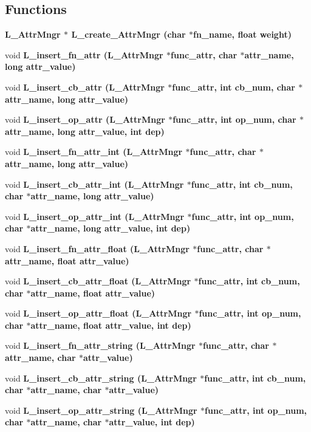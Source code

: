 \subsection*{Functions}
\begin{CompactItemize}
\item 
\bf{L\_\-Attr\-Mngr} $\ast$ \bf{L\_\-create\_\-Attr\-Mngr} (char $\ast$fn\_\-name, float weight)
\item 
void \bf{L\_\-insert\_\-fn\_\-attr} (\bf{L\_\-Attr\-Mngr} $\ast$func\_\-attr, char $\ast$attr\_\-name, long attr\_\-value)
\item 
void \bf{L\_\-insert\_\-cb\_\-attr} (\bf{L\_\-Attr\-Mngr} $\ast$func\_\-attr, int cb\_\-num, char $\ast$attr\_\-name, long attr\_\-value)
\item 
void \bf{L\_\-insert\_\-op\_\-attr} (\bf{L\_\-Attr\-Mngr} $\ast$func\_\-attr, int op\_\-num, char $\ast$attr\_\-name, long attr\_\-value, int dep)
\item 
void \bf{L\_\-insert\_\-fn\_\-attr\_\-int} (\bf{L\_\-Attr\-Mngr} $\ast$func\_\-attr, char $\ast$attr\_\-name, long attr\_\-value)
\item 
void \bf{L\_\-insert\_\-cb\_\-attr\_\-int} (\bf{L\_\-Attr\-Mngr} $\ast$func\_\-attr, int cb\_\-num, char $\ast$attr\_\-name, long attr\_\-value)
\item 
void \bf{L\_\-insert\_\-op\_\-attr\_\-int} (\bf{L\_\-Attr\-Mngr} $\ast$func\_\-attr, int op\_\-num, char $\ast$attr\_\-name, long attr\_\-value, int dep)
\item 
void \bf{L\_\-insert\_\-fn\_\-attr\_\-float} (\bf{L\_\-Attr\-Mngr} $\ast$func\_\-attr, char $\ast$attr\_\-name, float attr\_\-value)
\item 
void \bf{L\_\-insert\_\-cb\_\-attr\_\-float} (\bf{L\_\-Attr\-Mngr} $\ast$func\_\-attr, int cb\_\-num, char $\ast$attr\_\-name, float attr\_\-value)
\item 
void \bf{L\_\-insert\_\-op\_\-attr\_\-float} (\bf{L\_\-Attr\-Mngr} $\ast$func\_\-attr, int op\_\-num, char $\ast$attr\_\-name, float attr\_\-value, int dep)
\item 
void \bf{L\_\-insert\_\-fn\_\-attr\_\-string} (\bf{L\_\-Attr\-Mngr} $\ast$func\_\-attr, char $\ast$attr\_\-name, char $\ast$attr\_\-value)
\item 
void \bf{L\_\-insert\_\-cb\_\-attr\_\-string} (\bf{L\_\-Attr\-Mngr} $\ast$func\_\-attr, int cb\_\-num, char $\ast$attr\_\-name, char $\ast$attr\_\-value)
\item 
void \bf{L\_\-insert\_\-op\_\-attr\_\-string} (\bf{L\_\-Attr\-Mngr} $\ast$func\_\-attr, int op\_\-num, char $\ast$attr\_\-name, char $\ast$attr\_\-value, int dep)

\end{CompactItemize}
